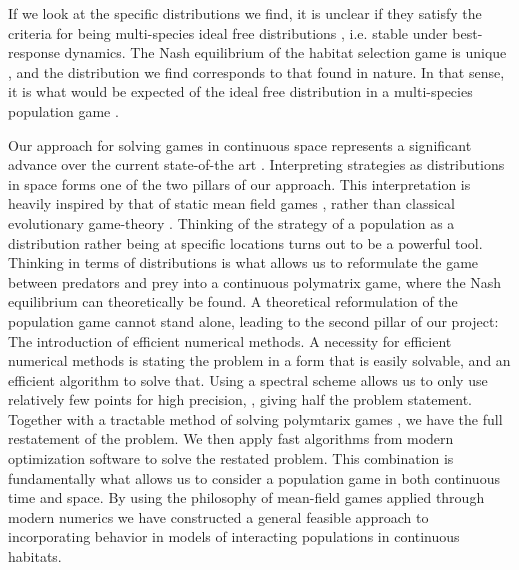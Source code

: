 If we look at the specific distributions we find, it is unclear if they satisfy the criteria for being multi-species ideal free distributions \citep{kvrivan2008ideal}, i.e. stable under best-response dynamics. The Nash equilibrium of the habitat selection game is unique \citep{verticalmigration}, and the distribution we find corresponds to that found in nature. In that sense, it is what would be expected of the ideal free distribution in a multi-species population game \citep{cressman2004ideal}.


Our approach for solving games in continuous space represents a significant advance over the current state-of-the art  \citep{mariani2016migration, pinti2021co}. Interpreting strategies as distributions in space forms one of the two pillars of our approach. This interpretation is heavily inspired by that of static mean field games \citep{lasry2007mean, blanchet2016optimal}, rather than classical evolutionary game-theory \cite{hofbauer1998evolutionary}. Thinking of the strategy of a population as a distribution rather being at specific locations turns out to be a powerful tool. Thinking in terms of distributions is what allows us to reformulate the game between predators and prey into a continuous polymatrix game, where the Nash equilibrium can theoretically be found. A theoretical reformulation of the population game cannot stand alone, leading to the second pillar of our project: The introduction of efficient numerical methods. A necessity for efficient numerical methods is stating the problem in a form that is easily solvable, and an efficient algorithm to solve that. Using a spectral scheme allows us to only use relatively few points for high precision, \citep{kopriva2009implementing}, giving half the problem statement. Together with a tractable method of solving polymtarix games \citep{miller1991copositive}, we have the full restatement of the problem. We then apply fast algorithms from modern optimization software \citep{Andersson2019, acary2019introduction} to solve the restated problem. This combination is fundamentally what allows us to consider a population game in both continuous time and space. By using the philosophy of mean-field games applied through modern numerics we have constructed a general feasible approach to incorporating behavior in models of interacting populations in continuous habitats.

